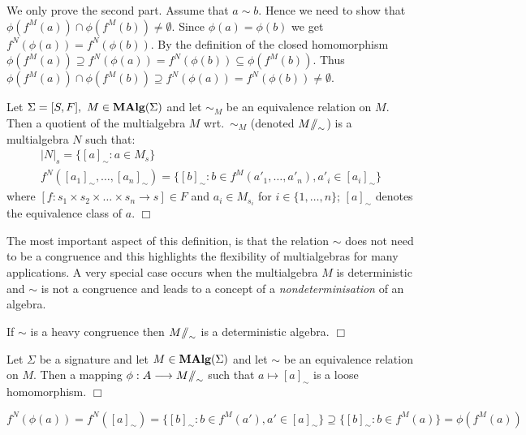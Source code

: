 \begin{Proof} We only prove the second part. Assume that $a \sim
b$. Hence we need to show that $\phi(f^M(a)) \cap \phi(f^M(b)) \not=
\emptyset$.  Since $\phi(a) = \phi(b)$ we get $f^N(\phi(a)) =
f^N(\phi(b))$.  By the definition of the closed homomorphism
$\phi(f^M(a)) \supseteq f^N(\phi(a)) = f^N(\phi(b)) \subseteq
\phi(f^M(b))$.  Thus $\phi(f^M(a)) \cap \phi(f^M(b)) \supseteq
f^N(\phi(a)) = f^N(\phi(b)) \not= \emptyset$.
\end{Proof}

\begin{Definition}
Let $\Sigma = [S,F],\ M \in \mbox{\rm\bf MAlg}(\Sigma)$ and let $\sim_M$ be an
equivalence relation on $M$. Then a quotient of the multialgebra $M$
wrt.\ $\sim_M$ (denoted $M\mbox{$/\!\!/$}_\sim$) is a multialgebra $N$ such
that:
\[
\begin{array}{l}
|N|_s = \{ [a]_\sim : a \in M_s \} \\ 
f^N([a_1]_\sim,\ldots,[a_n]_\sim) = 
\{ [b]_\sim : b \in f^M(a'_1,\ldots,a'_n), a'_i \in [a_i]_\sim \}
\end{array}
\]
where $[f : s_1 \times s_2 \times \ldots \times s_n \rightarrow s] \in
F$ and $a_i \in M_{s_i}$ for $i \in \{1,\ldots,n\}$; $[a]_\sim$
denotes the equivalence class of $a$.  
\hfill$\Box$
\end{Definition}

The most important aspect of this definition, is that the relation
$\sim$ does not need to be a congruence and this highlights the
flexibility of multialgebras for many applications. A very special
case occurs when the multialgebra $M$ is deterministic and $\sim$ is
not a congruence and leads to a concept of a {\em nondeterminisation}
of an algebra.

\begin{Fact}
If $\sim$ is a heavy congruence then $M\mbox{$/\!\!/$}_\sim$ is a deterministic
algebra.
\hfill$\Box$
\end{Fact}

\begin{Lemma}
Let $\Sigma$ be a signature and let $M \in \mbox{\rm\bf MAlg}(\Sigma)$ and let
$\sim$ be an equivalence relation on $M$. Then a mapping $\phi: A
\longrightarrow M\mbox{$/\!\!/$}_\sim$ such that $a \mapsto [a]_\sim$ is a loose
homomorphism.
\hfill$\Box$
\end{Lemma}

\begin{Proof} 
$f^N(\phi(a)) = f^N([a]_\sim) = \{[b]_\sim : b \in f^M(a'), a' \in
[a]_\sim\} \supseteq \{[b]_\sim : b \in f^M(a)\} = \phi(f^M(a))$
\end{Proof}

